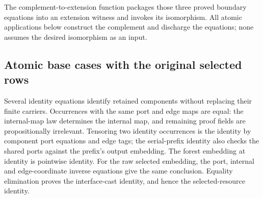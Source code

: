 





The complement-to-extension function packages those three proved boundary
equations into an extension witness and invokes its isomorphism. All atomic
applications below construct the complement and discharge the equations;
none assumes the desired isomorphism as an input.


\subsection{Atomic base cases with the original selected rows}

Several identity equations identify retained components without replacing
their finite carriers. Occurrences with the same port and edge maps are equal:
the internal-map law determines the internal map, and remaining proof fields
are propositionally irrelevant. Tensoring two identity occurrences is the
identity by component port equations and edge tags; the serial-prefix identity
also checks the shared ports against the prefix's output embedding. The
forest embedding at identity is pointwise identity. For the raw selected
embedding, the port, internal and edge-coordinate inverse equations give the
same conclusion. Equality elimination proves the interface-cast identity,
and hence the selected-resource identity.





